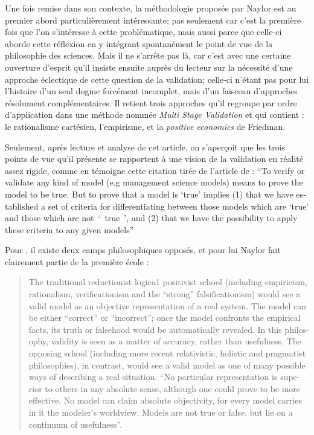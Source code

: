 Une fois remise dans son contexte, la méthodologie proposée par Naylor est au premier abord particulièrement intéressante; pas seulement car c'est la première fois que l'on s'intéresse à cette problématique, mais aussi parce que celle-ci aborde cette réflexion en y intégrant spontanément le point de vue de la philosophie des sciences. Mais il ne s'arrête pas là, car c'est avec une certaine ouverture d'esprit qu'il insiste ensuite auprès du lecteur sur la nécessité d'une approche éclectique de cette question de la validation; celle-ci n'étant pas pour lui l'histoire d'un seul dogme forcément incomplet, mais d'un faisceau d'approches résolument complémentaires. Il retient trois approches qu'il regroupe par ordre d'application dans une méthode nommée \textit{Multi Stage Validation} et qui contient : le rationalisme cartésien, l'empirisme, et la \textit{positive economics} de Friedman.

Seulement, après lecture et analyse de cet article, on s'aperçoit que les trois points de vue qu'il présente se rapportent à une vision de la validation en réalité assez rigide, comme en témoigne cette citation tirée de l'article de \textcite{Naylor1967} : \foreignquote{english}{To verify or validate any kind of model (e.g management science models) means to prove the model to be true. But to prove that a model is \enquote{true} implies (1) that we have established a set of criteria for differentiating between those models which are \enquote{true} and those which are not \enquote{ true }, and (2) that we have the possibility to apply these criteria to any given models}

Pour \textcite{Barlas1990, Barlas1996}, il existe deux camps philosophiques opposés, et pour lui Naylor fait clairement partie de la première école :

\foreignblockquote{english}[\cite{Barlas1990}]{The traditional reductionist logica1 positivist school (including empiricism, rationalism, verificationism and the “strong” falsificationism) would see a valid model as an objective representation of a real system. The model can be either “correct” or “incorrect”; once the model confronts the empirical facts, its truth or falsehood would be automatically revealed. In this philosophy, validity is seen as a matter of accuracy, rather than usefulness. The opposing school (including more recent relativistic, holistic and pragmatist philosophies), in contrast, would see a valid model as one of many possible ways of describing a real situation. \enquote{No particular representation is superior to others in any absolute sense, although one could prove to be more effective. No model can claim absolute objectivity, for every model carries in it the modeler’s worldview. Models are not true or false, but lie on a continuum of usefulness}.}

